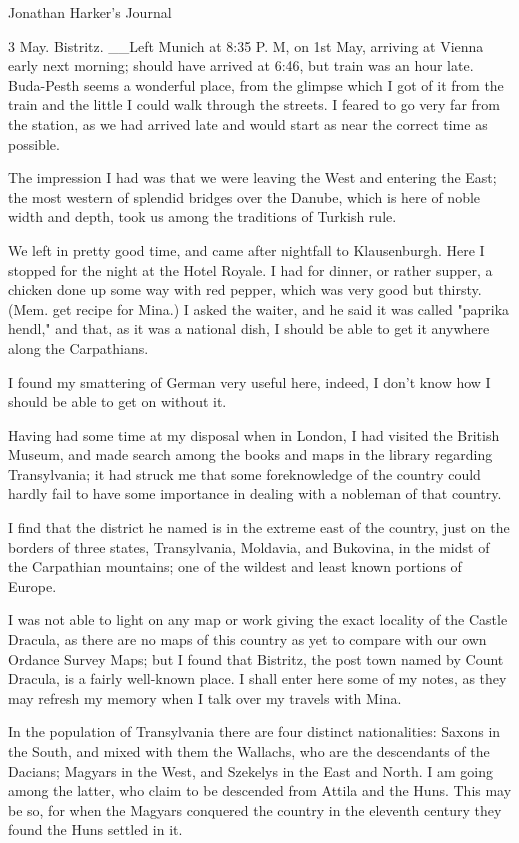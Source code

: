 Jonathan Harker's Journal 

3 May. Bistritz. __Left Munich at 8:35 P. M, on 1st May, arriving at Vienna early next morning; should have arrived at 6:46, but train was an hour late. Buda-Pesth seems a wonderful place, from the glimpse which I got of it from the train and the little I could walk through the streets. I feared to go very far from the station, as we had arrived late and would start as near the correct time as possible. 

The impression I had was that we were leaving the West and entering the East; the most western of splendid bridges over the Danube, which is here of noble width and depth, took us among the traditions of Turkish rule. 

We left in pretty good time, and came after nightfall to Klausenburgh. Here I stopped for the night at the Hotel Royale. I had for dinner, or rather supper, a chicken done up some way with red pepper, which was very good but thirsty. (Mem. get recipe for Mina.) I asked the waiter, and he said it was called "paprika hendl," and that, as it was a national dish, I should be able to get it anywhere along the Carpathians. 

I found my smattering of German very useful here, indeed, I don't know how I should be able to get on without it. 

Having had some time at my disposal when in London, I had visited the British Museum, and made search among the books and maps in the library regarding Transylvania; it had struck me that some foreknowledge of the country could hardly fail to have some importance in dealing with a nobleman of that country. 

I find that the district he named is in the extreme east of the country, just on the borders of three states, Transylvania, Moldavia, and Bukovina, in the midst of the Carpathian mountains; one of the wildest and least known portions of Europe. 

I was not able to light on any map or work giving the exact locality of the Castle Dracula, as there are no maps of this country as yet to compare with our own Ordance Survey Maps; but I found that Bistritz, the post town named by Count Dracula, is a fairly well-known place. I shall enter here some of my notes, as they may refresh my memory when I talk over my travels with Mina. 

In the population of Transylvania there are four distinct nationalities: Saxons in the South, and mixed with them the Wallachs, who are the descendants of the Dacians; Magyars in the West, and Szekelys in the East and North. I am going among the latter, who claim to be descended from Attila and the Huns. This may be so, for when the Magyars conquered the country in the eleventh century they found the Huns settled in it. 

